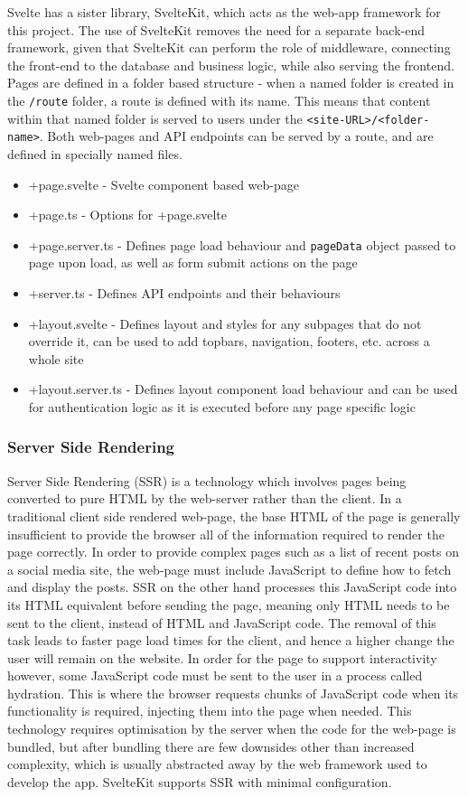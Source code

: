 Svelte has a sister library, SvelteKit, which acts as the web-app framework for this project. The use of SvelteKit removes the need for a separate back-end framework, given that SvelteKit can perform the role of middleware, connecting the front-end to the database and business logic, while also serving the frontend. Pages are defined in a folder based structure - when a named folder is created in the \texttt{/route} folder, a route is defined with its name. This means that content within that named folder is served to users under the \texttt{<site-URL>/<folder-name>}. Both web-pages and API endpoints can be served by a route, and are defined in specially named files.
\begin{itemize}
    \item +page.svelte - Svelte component based web-page
    \item +page.ts - Options for +page.svelte
    \item +page.server.ts - Defines page load behaviour and \texttt{pageData} object passed to page upon load, as well as form submit actions on the page
    \item +server.ts - Defines API endpoints and their behaviours
    \item +layout.svelte - Defines layout and styles for any subpages that do not override it, can be used to add topbars, navigation, footers, etc. across a whole site
    \item +layout.server.ts - Defines layout component load behaviour and can be used for authentication logic as it is executed before any page specific logic
\end{itemize}

\subsubsection{Server Side Rendering}
Server Side Rendering (SSR) is a technology which involves pages being converted to pure HTML by the web-server rather than the client. In a traditional client side rendered web-page, the base HTML of the page is generally insufficient to provide the browser all of the information required to render the page correctly. In order to provide complex pages such as a list of recent posts on a social media site, the web-page must include JavaScript to define how to fetch and display the posts. SSR on the other hand processes this JavaScript code into its HTML equivalent before sending the page, meaning only HTML needs to be sent to the client, instead of HTML and JavaScript code\cite{}. The removal of this task leads to faster page load times for the client, and hence a higher change the user will remain on the website\cite{}. In order for the page to support interactivity however, some JavaScript code must be sent to the user in a process called hydration. This is where the browser requests chunks of JavaScript code when its functionality is required, injecting them into the page when needed. This technology requires optimisation by the server when the code for the web-page is bundled, but after bundling there are few downsides other than increased complexity, which is usually abstracted away by the web framework used to develop the app. SvelteKit supports SSR with minimal configuration.


